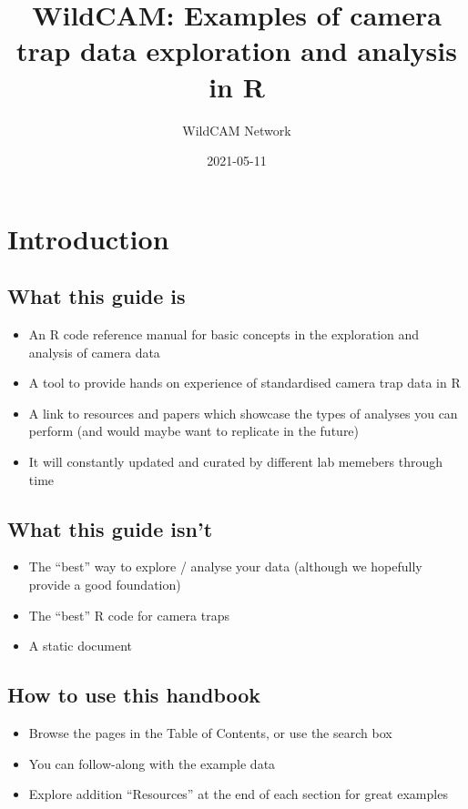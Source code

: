\documentclass[]{book}
\title{WildCAM: Examples of camera trap data exploration and analysis in R}
\author{WildCAM Network}
\date{2021-05-11}
\providecommand{\tightlist}{%
  \setlength{\itemsep}{0pt}\setlength{\parskip}{0pt}}
\begin{document}
\maketitle

{
\setcounter{tocdepth}{1}
\tableofcontents
}
\chapter{Introduction}\label{introduction}

\section{What this guide is}\label{what-this-guide-is}

\begin{itemize}
\tightlist
\item
  An R code reference manual for basic concepts in the exploration and
  analysis of camera data
\item
  A tool to provide hands on experience of standardised camera trap data
  in R
\item
  A link to resources and papers which showcase the types of analyses
  you can perform (and would maybe want to replicate in the future)
\item
  It will constantly updated and curated by different lab memebers
  through time
\end{itemize}

\section{What this guide isn't}\label{what-this-guide-isnt}

\begin{itemize}
\tightlist
\item
  The ``best'' way to explore / analyse your data (although we hopefully
  provide a good foundation)
\item
  The ``best'' R code for camera traps
\item
  A static document
\end{itemize}

\section{How to use this handbook}\label{how-to-use-this-handbook}

\begin{itemize}
\tightlist
\item
  Browse the pages in the Table of Contents, or use the search box
\item
  You can follow-along with the example data
\item
  Explore addition ``Resources'' at the end of each section for great
  examples
\end{itemize}
\end{document}
